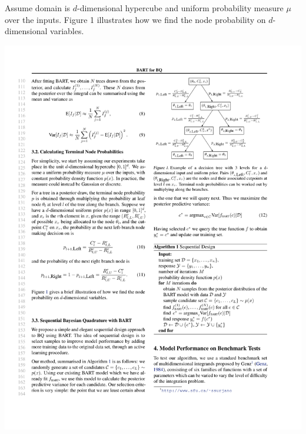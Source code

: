 \documentclass[a0,portrait]{a0poster}
\begin{document}
\begin{multicols}{3}
Assume domain is $d$-dimensional hypercube and uniform probability measure $\mu$ over the inputs.
Figure 1 illustrates how we find the node probability on $d$-dimensional variables.
\begin{center}\vspace{1cm}
\includegraphics[width=.9\linewidth]{figure-1}
\end{center}




\end{multicols}
\end{document}
